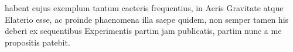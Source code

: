                      habent 
                     {}  
                     cujus exemplum tantum caeteris  frequentius, in Aeris Gravitate\protect{} atque Elaterio\protect{} esse, ac proinde  phaenomena illa saepe quidem, non semper tamen his deberi ex sequentibus  Experimentis partim jam publicatis, partim nunc a me propositis patebit.   \pend 